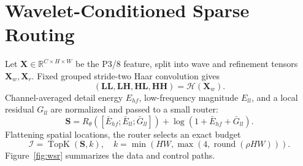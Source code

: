 \documentclass[conference]{IEEEtran}
\begin{document}
\section{Wavelet-Conditioned Sparse Routing}
Let $\mathbf X\in\mathbb R^{C\times H\times W}$ be the P3/8 feature, split into wave and refinement tensors $\mathbf X_w,\mathbf X_r$. Fixed grouped stride-two Haar convolution gives
\begin{equation}
(\mathbf{LL},\mathbf{LH},\mathbf{HL},\mathbf{HH})=\mathcal H(\mathbf X_w).
\end{equation}
Channel-averaged detail energy $E_{hf}$, low-frequency magnitude $E_{ll}$, and a local residual $G_{ll}$ are normalized and passed to a small router:
\begin{equation}
\mathbf S=R_\theta([\bar E_{hf};\bar E_{ll};\bar G_{ll}])
+\log(1+\bar E_{hf}+\bar G_{ll}).
\end{equation}
Flattening spatial locations, the router selects an exact budget
\begin{equation}
\mathcal I=\operatorname{TopK}(\mathbf S,k),\quad
k=\min(HW,\max(4,\operatorname{round}(\rho HW))).
\end{equation}
Figure~\ref{fig:wsr} summarizes the data and control paths.
\end{document}
